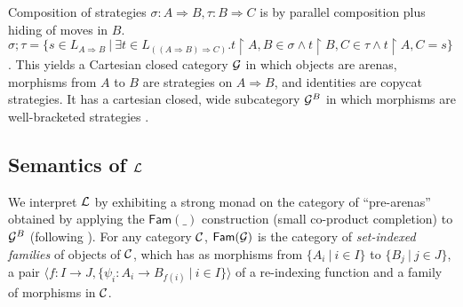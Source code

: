 \documentclass{eptcs}
\def\C{{\cal{C}}}
\def\G{{\cal{G}}}
\def\L{{\cal{L}}}
\def\restrict{\!\! \upharpoonright \!\!}
\def\restrict{\!\! \upharpoonright \!\!}
\newcommand{\Fam}{{\mathsf{Fam}}}
\begin{document}
Composition of strategies $\sigma: A \Rightarrow B,\tau: B \Rightarrow C$ is by parallel composition plus hiding of moves in $B$. 
$\sigma;\tau =  \{s \in L_{A\Rightarrow B}\ |\ \exists t \in L_{((A \Rightarrow B) \Rightarrow C)}.t\restrict A,B \in \sigma \wedge t \restrict B,C  \in \tau \wedge t \restrict A,C = s\}$. This  yields a Cartesian closed category $\G$  in which objects are arenas, morphisms from $A$ to $B$ are strategies on $A \Rightarrow B$, and identities are copycat strategies. It has a cartesian closed, wide subcategory $\G^{B}$ in which morphisms are well-bracketed strategies  \cite{AHM,LT}. 

\subsection{Semantics of $\L$}
We interpret $\L$ by exhibiting a strong monad on the category of ``pre-arenas'' obtained by applying the $\Fam(\_)$ construction (small co-product completion) to $\G^B$ (following \cite{AMV}). For any category $\C$, $\Fam(\G)$ is the category of \emph{set-indexed families} of objects of $\C$, which has as morphisms from $\{A_i \ |\ i \in I\}$ to $\{B_j\ |\ j \in J\}$, a pair $\langle f:I \rightarrow J,\{\psi_i:A_i \rightarrow B_{f(i)}\ |\ i \in I\}\rangle$ of a re-indexing function and a family of morphisms in $\C$. 
\end{document}
